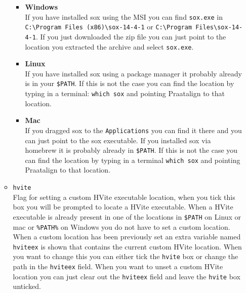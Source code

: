 \begin{itemize}
\begin{itemize}
				\begin{itemize}
					\item \textbf{Windows}\\
						If you have installed sox using the MSI you can find
						\texttt{sox.exe} in \texttt{
						C:\textbackslash Program Files (x86)\textbackslash sox-14-4-1} or
						\texttt{C:\textbackslash Program Files\textbackslash sox-14-4-1}.
						If you just downloaded the zip file you can just point to the
						location you extracted the archive and select \texttt{sox.exe}.
					\item \textbf{Linux}\\
						If you have installed sox using a package manager it probably
						already is in your \texttt{\$PATH}. If this is not the case you can
						find the location by typing in a terminal: \texttt{which sox} and
						pointing Praatalign to that location.
					\item \textbf{Mac}\\
						If you dragged sox to the \texttt{Applications} you can find it
						there and you can just point to the sox executable. If you
						installed sox via homebrew it is probably already in
						\texttt{\$PATH}. If this is not the case you can find the location
						by typing in a terminal \texttt{which sox} and pointing Praatalign
						to that location.
				\end{itemize}
			\item \texttt{hvite}\\
				Flag for setting a custom HVite executable location, when you tick this
				box you will be prompted to locate a HVite executable. When a HVite
				executable is already present in one of the locations in
				\texttt{\$PATH} on Linux or mac or \texttt{\%PATH\%} on Windows you do
				not have to set a custom location. When a custom location has been
				previously set an extra variable named \texttt{hviteex} is shown that
				contains the current custom HVite location. When you want to change
				this you can either tick the \texttt{hvite} box or change the path in
				the \texttt{hviteex} field. When you want to unset a custom HVite
				location you can just clear out the \texttt{hviteex} field and leave
				the \texttt{hvite} box unticked.


\end{itemize}
\end{itemize}
